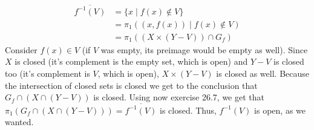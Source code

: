 \documentclass{article}
\begin{document}
    \begin{align*}
        \overline{f^{-1}(V)} &= \{x \mid f(x) \notin V\} \\
        &= \pi_1((x, f(x)) \mid f(x) \notin V) \\
        &= \pi_1((X \times (Y - V)) \cap G_f)
    \end{align*}
    Consider $f(x) \in V$ (if $V$ was empty, its preimage would be empty as well). Since $X$ is closed (it's complement is the empty set, which is open) and $Y - V$ is closed too (it's complement is $V$, which is open), $X \times (Y - V)$ is closed as well. Because the intersection of closed sets is closed we get to the conclusion that $G_f \cap (X \cap (Y - V))$ is closed. Using now exercise 26.7, we get that $\pi_1(G_f \cap (X \cap (Y - V))) = \overline{f^{-1}(V)}$ is closed. Thus, $f^{-1}(V)$ is open, as we wanted.
\end{document}
